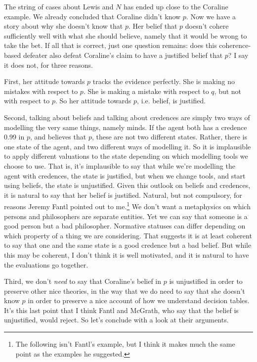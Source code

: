 \documentclass[11pt,oneside]{book}
\begin{document}
The string of cases about Lewis and $N$ has ended up close to the Coraline example. We already concluded that Coraline didn't know $p$. Now we have a story about why she doesn't know that $p$. Her belief that $p$ doesn't cohere sufficiently well with what she should believe, namely that it would be wrong to take the bet. If all that is correct, just one question remains: does this coherence-based defeater also defeat Coraline's claim to have a justified belief that $p$? I say it does not, for three reasons.

First, her attitude towards $p$ tracks the evidence perfectly. She is making no mistakes with respect to $p$. She is making a mistake with respect to $q$, but not with respect to $p$. So her attitude towards $p$, i.e. belief, is justified.

Second, talking about beliefs and talking about credences are simply two ways of modelling the very same things, namely minds. If the agent both has a credence 0.99 in $p$, and believes that $p$, these are not two different states. Rather, there is one state of the agent, and two different ways of modelling it. So it is implausible to apply different valuations to the state depending on which modelling tools we choose to use. That is, it's implausible to say that while we're modelling the agent with credences, the state is justified, but when we change tools, and start using beliefs, the state is unjustified. Given this outlook on beliefs and credences, it is natural to say that her belief is justified. Natural, but not compulsory, for reasons Jeremy Fantl pointed out to me.\footnote{The following isn't Fantl's example, but I think it makes much the same point as the examples he suggested.} We don't want a metaphysics on which persons and philosophers are separate entities. Yet we can say that someone is a good person but a bad philosopher. Normative statuses can differ depending on which property of a thing we are considering. That suggests it is at least coherent to say that one and the same state is a good credence but a bad belief. But while this may be coherent, I don't think it is well motivated, and it is natural to have the evaluations go together.

Third, we don't \textit{need} to say that Coraline's belief in $p$ is unjustified in order to preserve other nice theories, in the way that we do need to say that she doesn't know $p$ in order to preserve a nice account of how we understand decision tables. It's this last point that I think Fantl and McGrath, who say that the belief is unjustified, would reject. So let's conclude with a look at their arguments.
\end{document}
